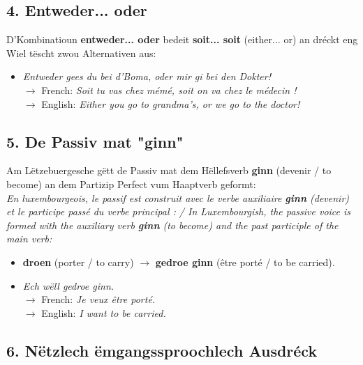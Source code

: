 \subsection*{4. Entweder... oder}

D'Kombinatioun \textbf{entweder... oder} bedeit \textbf{soit... soit} (either... or) an dréckt eng Wiel tëscht zwou Alternativen aus:
\begin{itemize}
    \item \textit{Entweder gees du bei d'Boma, oder mir gi bei den Dokter!} \\
    $\rightarrow$ French: \textit{Soit tu vas chez mémé, soit on va chez le médecin !} \\
    $\rightarrow$ English: \textit{Either you go to grandma's, or we go to the doctor!}
\end{itemize}

\subsection*{5. De Passiv mat "ginn"}

Am Lëtzebuergesche gëtt de Passiv mat dem Hëllefsverb \textbf{ginn} (devenir / to become) an dem Partizip Perfect vum Haaptverb geformt: \\
\textit{En luxembourgeois, le passif est construit avec le verbe auxiliaire \textbf{ginn} (devenir) et le participe passé du verbe principal : / In Luxembourgish, the passive voice is formed with the auxiliary verb \textbf{ginn} (to become) and the past participle of the main verb:}
\begin{itemize}
    \item \textbf{droen} (porter / to carry) $\rightarrow$ \textbf{gedroe ginn} (être porté / to be carried).
    \item \textit{Ech wëll gedroe ginn.} \\
    $\rightarrow$ French: \textit{Je veux être porté.} \\
    $\rightarrow$ English: \textit{I want to be carried.}
\end{itemize}

\subsection*{6. Nëtzlech ëmgangssproochlech Ausdréck}

